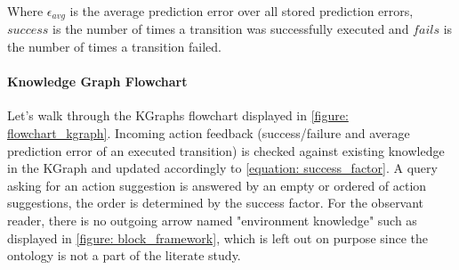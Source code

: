 Where $\epsilon_{avg}$ is the average prediction error over all stored prediction errors, $success$ is the number of times a transition was successfully executed and $fails$ is the number of times a transition failed. \\

\paragraph{Knowledge Graph Flowchart}
Let's walk through the KGraphs flowchart displayed in \cref{figure: flowchart_kgraph}. Incoming action feedback (success/failure and average prediction error of an executed transition) is checked against existing knowledge in the KGraph and updated accordingly to \cref{equation: success_factor}. A query asking for an action suggestion is answered by an empty or ordered of action suggestions, the order is determined by the success factor. For the observant reader, there is no outgoing arrow named "environment knowledge" such as displayed in \cref{figure: block_framework}, which is left out on purpose since the ontology is not a part of the literate study. 


